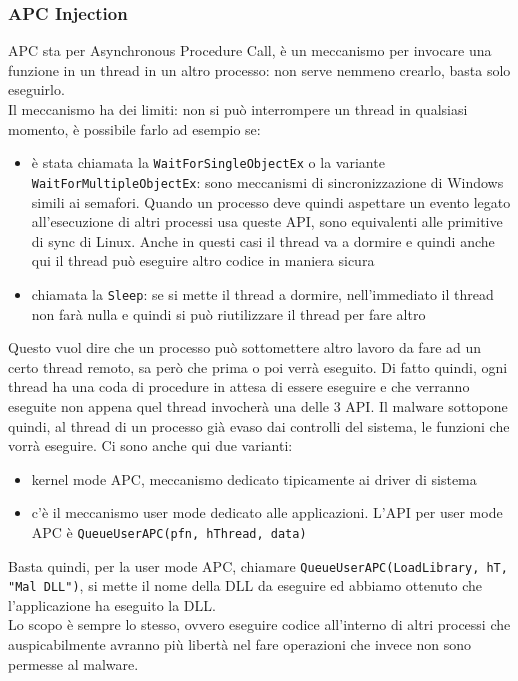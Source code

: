 \documentclass[12pt, oneside]{extbook}
\begin{document}
\subsubsection{APC Injection}
APC sta per Asynchronous Procedure Call, è un meccanismo per invocare una funzione in un thread in un altro processo: non serve nemmeno crearlo, basta solo eseguirlo.\\Il meccanismo ha dei limiti: non si può interrompere un thread in qualsiasi momento, è possibile farlo ad esempio se:
\begin{itemize}
	\item è stata chiamata la \texttt{WaitForSingleObjectEx} o la variante \texttt{WaitForMultipleObjectEx}: sono meccanismi di sincronizzazione di Windows simili ai semafori. Quando un processo deve quindi aspettare un evento legato all'esecuzione di altri processi usa queste API, sono equivalenti alle primitive di sync di Linux. Anche in questi casi il thread va a dormire e quindi anche qui il thread può eseguire altro codice in maniera sicura
	\item chiamata la \texttt{Sleep}: se si mette il thread a dormire, nell'immediato il thread non farà nulla e quindi si può riutilizzare il thread per fare altro
\end{itemize}
Questo vuol dire che un processo può sottomettere altro lavoro da fare ad un certo thread remoto, sa però che prima o poi verrà eseguito. Di fatto quindi, ogni thread ha una coda di procedure in attesa di essere eseguire e che verranno eseguite non appena quel thread invocherà una delle 3 API. Il malware sottopone quindi, al thread di un processo già evaso dai controlli del sistema, le funzioni che vorrà eseguire. Ci sono anche qui due varianti:
\begin{itemize}
	\item kernel mode APC, meccanismo dedicato tipicamente ai driver di sistema
	\item c'è il meccanismo user mode dedicato alle applicazioni. L'API per user mode APC è \texttt{QueueUserAPC(pfn, hThread, data)}
\end{itemize}
Basta quindi, per la user mode APC, chiamare \texttt{QueueUserAPC(LoadLibrary, hT, "Mal DLL")}, si mette il nome della DLL da eseguire ed abbiamo ottenuto che l'applicazione ha eseguito la DLL.\\Lo scopo è sempre lo stesso, ovvero eseguire codice all'interno di altri processi che auspicabilmente avranno più libertà nel fare operazioni che invece non sono permesse al malware.
\end{document}
